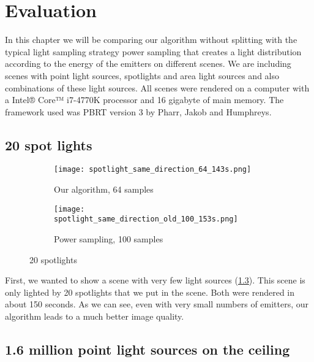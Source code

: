
\chapter{Evaluation}
\label{ch:Evaluation}

In this chapter we will be comparing our algorithm without splitting with the typical light sampling strategy power sampling that creates a light distribution according to the energy of the emitters on different scenes. We are including scenes with point light sources, spotlights and area light sources and also combinations of these light sources. All scenes were rendered on a computer with a Intel® Core™ i7-4770K processor and 16 gigabyte of main memory. The framework used was PBRT version 3 by Pharr, Jakob and Humphreys. \cite{PBRT}

\section{20 spot lights}

\begin{figure}
	\centering
	\begin{subfigure}{.5\textwidth}
		\centering
		\texttt{[image: spotlight\_same\_direction\_64\_143s.png]}
		\caption{Our algorithm, 64 samples}
		\label{fig:spot1}
	\end{subfigure}%
	\begin{subfigure}{.5\textwidth}
		\centering
		\texttt{[image: spotlight\_same\_direction\_old\_100\_153s.png]}
		\caption{Power sampling, 100 samples}
		\label{fig:spot2}
	\end{subfigure}
	\caption{20 spotlights}
	\label{fig:spot}
\end{figure}

First, we wanted to show a scene with very few light sources (\ref{fig:spot}). This scene is only lighted by 20 spotlights that we put in the scene. Both were rendered in about 150 seconds. As we can see, even with very small numbers of emitters, our algorithm leads to a much better image quality.

\section{1.6 million point light sources on the ceiling}


